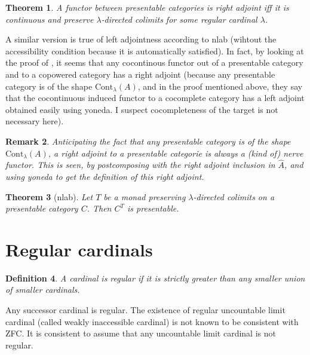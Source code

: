 \documentclass{article}
\newcommand{\Cont}[1]{\text{Cont}_{#1}}
\newtheorem{theorem}{Theorem}[section]
\newtheorem{definition}[theorem]{Definition}
\newtheorem{remark}[theorem]{Remark}
\begin{document}
\begin{theorem}
  \cite[1.66]{adamek_rosicky}
  A functor between presentable categories is right adjoint iff it is continuous
  and preserve $\lambda$-directed colimits for some regular cardinal $\lambda$.
  \end{theorem}
  A similar version is true of left adjointness according to nlab (wihtout the
  accessibility condition because it is automatically satisfied).
  In fact, by looking at the proof of \cite[Representation theorem
  1.45]{adamek_rosicky}, it seems that any cocontinous functor out of a
  presentable category and to a copowered category
  has a right adjoint (because any presentable category is of the shape $\Cont\lambda(A)$, and in the proof mentioned above, they say that the cocontinuous induced functor to a cocomplete category has a left adjoint obtained easily using yoneda. I suspect cocompleteness of the target is not necessary here).

  \begin{remark}
	  Anticipating the fact that any presentable category is of the shape $\Cont\lambda(A)$,
	  a right adjoint to a presentable categorie is always a (kind of) nerve functor. This is seen, by postcomposing with the right adjoint inclusion in $\hat{A}$, and using yoneda to get the definition of this right adjoint.
  \end{remark}

  \begin{theorem}[nlab]
   Let $T$  be a monad preserving $\lambda$-directed colimits on a presentable category $C$.
   Then $C^T$ is presentable.
  \end{theorem}

\section{Regular cardinals}
\begin{definition}
 A cardinal is regular if it is strictly greater than any smaller union of smaller cardinals.
\end{definition}
Any successor cardinal is regular. The existence of regular uncountable limit
cardinal (called weakly inaccessible cardinal) is not known to be consistent with
ZFC. It is consistent to assume that any uncountable limit cardinal is not regular.
\end{document}
